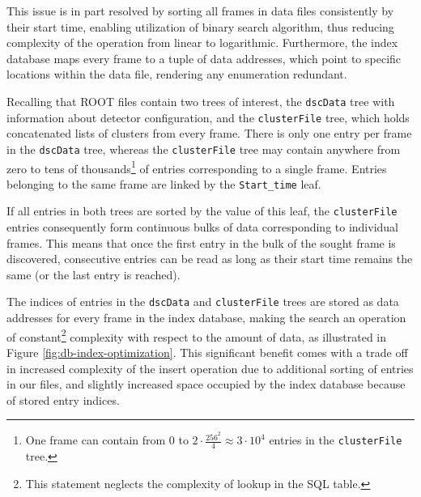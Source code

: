 This issue is in part resolved by sorting all frames in data files consistently by their start time, enabling utilization of binary search algorithm, thus reducing complexity of the operation from linear to logarithmic. Furthermore, the index database maps every frame to a tuple of data addresses, which point to specific locations within the data file, rendering any enumeration redundant.

Recalling that ROOT files contain two trees of interest, the \texttt{dscData} tree with information about detector configuration, and the \texttt{clusterFile} tree, which holds concatenated lists of clusters from every frame. There is only one entry per frame in the \texttt{dscData} tree, whereas the \texttt{clusterFile} tree may contain anywhere from zero to tens of thousands\footnote{One frame can contain from 0 to $2\cdot \frac{256^2}{4}\approx 3\cdot 10^4$ entries in the \texttt{clusterFile} tree.} of entries corresponding to a single frame. Entries belonging to the same frame are linked by the \texttt{Start\_time} leaf.

If all entries in both trees are sorted by the value of this leaf, the \texttt{clusterFile} entries consequently form continuous bulks of data corresponding to individual frames. This means that once the first entry in the bulk of the sought frame is discovered, consecutive entries can be read as long as their start time remains the same (or the last entry is reached).

The indices of entries in the \texttt{dscData} and \texttt{clusterFile} trees are stored as data addresses for every frame in the index database, making the search an operation of constant\footnote{This statement neglects the complexity of lookup in the SQL table.} complexity with respect to the amount of data, as illustrated in Figure \ref{fig:db-index-optimization}. This significant benefit comes with a trade off in increased complexity of the insert operation due to additional sorting of entries in our files, and slightly increased space occupied by the index database because of stored entry indices.

